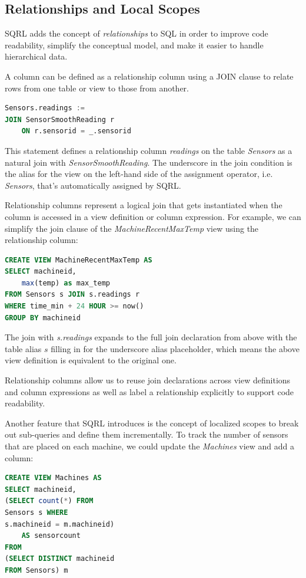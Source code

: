\documentclass[	DIV=calc,%
							paper=letter,%
							fontsize=11pt,%
							twocolumn]{scrartcl}	 					%
\begin{document}
\subsection{Relationships and Local Scopes}

SQRL adds the concept of \emph{relationships} to SQL in order to improve code readability, simplify the conceptual model, and make it easier to handle hierarchical data.

A column can be defined as a relationship column using a JOIN clause to relate rows from one table or view to those from another.
\begin{lstlisting}[language=SQL]
Sensors.readings :=
JOIN SensorSmoothReading r
    ON r.sensorid = _.sensorid
\end{lstlisting}

This statement defines a relationship column \emph{readings} on the table \emph{Sensors} as a natural join with \emph{SensorSmoothReading}.
The underscore in the join condition is the alias for the view on the left-hand side of the assignment operator, i.e. \emph{Sensors}, that's automatically assigned by SQRL.

Relationship columns represent a logical join that gets instantiated when the column is accessed in a view definition or column expression. For example, we can simplify the join clause of the \emph{MachineRecentMaxTemp} view using the relationship column:
\begin{lstlisting}[language=SQL]
CREATE VIEW MachineRecentMaxTemp AS
SELECT machineid,
    max(temp) as max_temp
FROM Sensors s JOIN s.readings r
WHERE time_min + 24 HOUR >= now()
GROUP BY machineid
\end{lstlisting}

The join with \emph{s.readings} expands to the full join declaration from above with the table alias $s$ filling in for the underscore alias placeholder, which means the above view definition is equivalent to the original one.

Relationship columns allow us to reuse join declarations across view definitions and column expressions as well as label a relationship explicitly to support code readability.

Another feature that SQRL introduces is the concept of localized scopes to break out sub-queries and define them incrementally. To track the number of sensors that are placed on each machine, we could update the \emph{Machines} view and add a column:

\begin{lstlisting}[language=SQL]
CREATE VIEW Machines AS
SELECT machineid,
(SELECT count(*) FROM
Sensors s WHERE
s.machineid = m.machineid)
    AS sensorcount
FROM
(SELECT DISTINCT machineid
FROM Sensors) m
\end{lstlisting}
\end{document}
